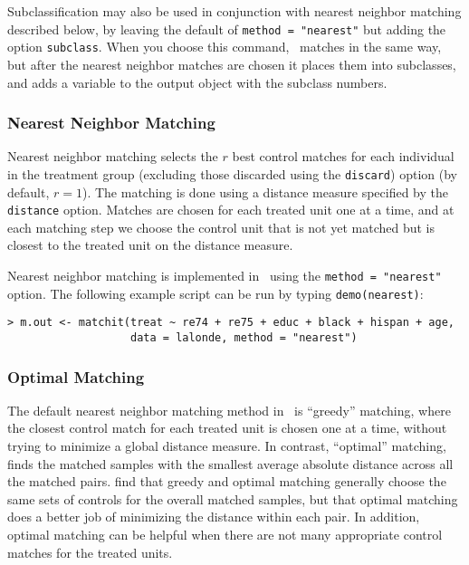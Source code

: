 Subclassification may also be used in conjunction with nearest
neighbor matching described below, by leaving the default of
\texttt{method = "nearest"} but adding the option \texttt{subclass}.
When you choose this command, \MatchIt\ matches in the same way, but
after the nearest neighbor matches are chosen it places them into
subclasses, and adds a variable to the output object with the subclass
numbers.

\subsubsection{Nearest Neighbor Matching}
\label{subsubsec:nearest}

Nearest neighbor matching selects the $r$ best control matches for
each individual in the treatment group (excluding those discarded
using the \texttt{discard}) option (by default, $r=1$).  The matching
is done using a distance measure specified by the {\tt distance}
option.  Matches are chosen for each treated unit one at a time, and
at each matching step we choose the control unit that is not yet
matched but is closest to the treated unit on the distance measure.

Nearest neighbor matching is implemented in \MatchIt\ using the
\texttt{method = "nearest"} option.  The following example script can
be run by typing {\tt demo(nearest)}:
\begin{verbatim}
> m.out <- matchit(treat ~ re74 + re75 + educ + black + hispan + age, 
                   data = lalonde, method = "nearest")
\end{verbatim}

\subsubsection{Optimal Matching}
\label{subsubsec:optimal}

The default nearest neighbor matching method in \MatchIt\ is
``greedy'' matching, where the closest control match for each treated
unit is chosen one at a time, without trying to minimize a global
distance measure.  In contrast, ``optimal'' matching, finds the
matched samples with the smallest average absolute distance across all
the matched pairs.  \citet{GuRos93} find that greedy and optimal
matching generally choose the same sets of controls for the overall
matched samples, but that optimal matching does a better job of
minimizing the distance within each pair.  In addition, optimal
matching can be helpful when there are not many appropriate control
matches for the treated units.

